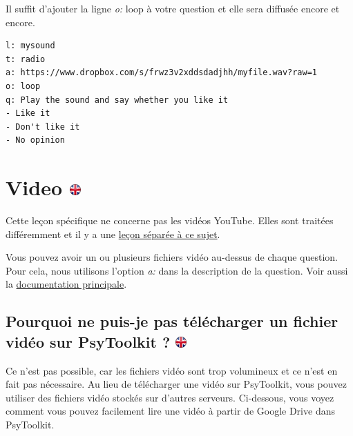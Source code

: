 \documentclass[
]{book}
\begin{document}
Il suffit d'ajouter la ligne \emph{o:} loop à votre question et elle sera diffusée encore et encore.

\begin{verbatim}
l: mysound
t: radio
a: https://www.dropbox.com/s/frwz3v2xddsdadjhh/myfile.wav?raw=1
o: loop
q: Play the sound and say whether you like it
- Like it
- Don't like it
- No opinion
\end{verbatim}

\hypertarget{video}{%
\section[Video ]{\texorpdfstring{Video \href{https://www.psytoolkit.org/lessons/surveyaudiovideo.html\#_video}{\protect\includegraphics{img/ukflag.png}}}{Video }}\label{video}}

Cette leçon spécifique ne concerne pas les vidéos YouTube. Elles sont traitées différemment et il y a une \href{https://www.psytoolkit.org/lessons/youtube_video.html}{leçon séparée à ce sujet}.

Vous pouvez avoir un ou plusieurs fichiers vidéo au-dessus de chaque question. Pour cela, nous utilisons l'option \emph{a:} dans la description de la question. Voir aussi la \protect\hyperlink{s8}{documentation principale}.

\hypertarget{pourquoi-ne-puis-je-pas-tuxe9luxe9charger-un-fichier-viduxe9o-sur-psytoolkit}{%
\subsection[Pourquoi ne puis-je pas télécharger un fichier vidéo sur PsyToolkit ? ]{\texorpdfstring{Pourquoi ne puis-je pas télécharger un fichier vidéo sur PsyToolkit ? \href{https://www.psytoolkit.org/lessons/surveyaudiovideo.html\#_why_can_i_not_upload_a_video_file_to_psytoolkit}{\protect\includegraphics{img/ukflag.png}}}{Pourquoi ne puis-je pas télécharger un fichier vidéo sur PsyToolkit ? }}\label{pourquoi-ne-puis-je-pas-tuxe9luxe9charger-un-fichier-viduxe9o-sur-psytoolkit}}

Ce n'est pas possible, car les fichiers vidéo sont trop volumineux et ce n'est en fait pas nécessaire. Au lieu de télécharger une vidéo sur PsyToolkit, vous pouvez utiliser des fichiers vidéo stockés sur d'autres serveurs. Ci-dessous, vous voyez comment vous pouvez facilement lire une vidéo à partir de Google Drive dans PsyToolkit.
\end{document}
